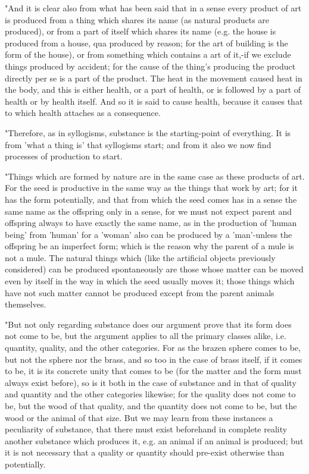 "And it is clear also from what has been said that in a sense every
product of art is produced from a thing which shares its name (as
natural products are produced), or from a part of itself which shares
its name (e.g. the house is produced from a house, qua produced by
reason; for the art of building is the form of the house), or from
something which contains a art of it,-if we exclude things produced
by accident; for the cause of the thing's producing the product directly
per se is a part of the product. The heat in the movement caused heat
in the body, and this is either health, or a part of health, or is
followed by a part of health or by health itself. And so it is said
to cause health, because it causes that to which health attaches as
a consequence. 

"Therefore, as in syllogisms, substance is the starting-point of everything.
It is from 'what a thing is' that syllogisms start; and from it also
we now find processes of production to start. 

"Things which are formed by nature are in the same case as these products
of art. For the seed is productive in the same way as the things that
work by art; for it has the form potentially, and that from which
the seed comes has in a sense the same name as the offspring only
in a sense, for we must not expect parent and offspring always to
have exactly the same name, as in the production of 'human being'
from 'human' for a 'woman' also can be produced by a 'man'-unless
the offspring be an imperfect form; which is the reason why the parent
of a mule is not a mule. The natural things which (like the artificial
objects previously considered) can be produced spontaneously are those
whose matter can be moved even by itself in the way in which the seed
usually moves it; those things which have not such matter cannot be
produced except from the parent animals themselves. 

"But not only regarding substance does our argument prove that its
form does not come to be, but the argument applies to all the primary
classes alike, i.e. quantity, quality, and the other categories. For
as the brazen sphere comes to be, but not the sphere nor the brass,
and so too in the case of brass itself, if it comes to be, it is its
concrete unity that comes to be (for the matter and the form must
always exist before), so is it both in the case of substance and in
that of quality and quantity and the other categories likewise; for
the quality does not come to be, but the wood of that quality, and
the quantity does not come to be, but the wood or the animal of that
size. But we may learn from these instances a peculiarity of substance,
that there must exist beforehand in complete reality another substance
which produces it, e.g. an animal if an animal is produced; but it
is not necessary that a quality or quantity should pre-exist otherwise
than potentially. 

